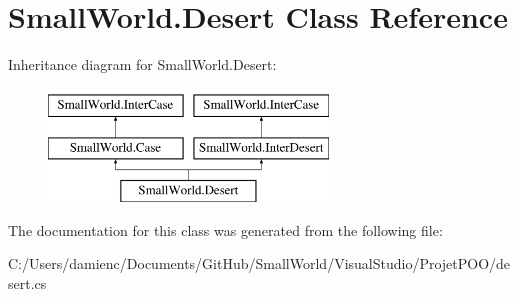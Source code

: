 \hypertarget{class_small_world_1_1_desert}{\section{Small\-World.\-Desert Class Reference}
\label{class_small_world_1_1_desert}
}
Inheritance diagram for Small\-World.\-Desert\-:\begin{figure}[H]
\begin{center}
\leavevmode
\includegraphics[height=3.000000cm]{class_small_world_1_1_desert}
\end{center}
\end{figure}


The documentation for this class was generated from the following file\-:\begin{DoxyCompactItemize}
\item 
C\-:/\-Users/damienc/\-Documents/\-Git\-Hub/\-Small\-World/\-Visual\-Studio/\-Projet\-P\-O\-O/desert.\-cs\end{DoxyCompactItemize}
